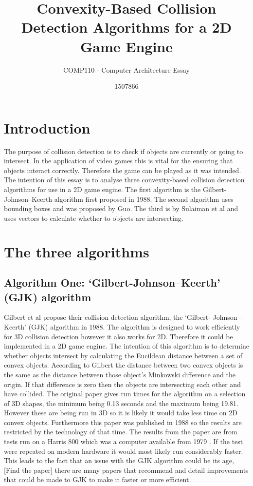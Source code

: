 \documentclass{scrartcl}
\title{Convexity-Based Collision Detection Algorithms for a 2D Game Engine}
\subtitle{COMP110 - Computer Architecture Essay}
\author{1507866}
\begin{document}
\maketitle


\section{Introduction}

The purpose of collision detection is to check if objects are currently or going to intersect. In the application of video games this is vital for the ensuring that objects interact correctly. Therefore the game can be played as it was intended.  The intention of this essay is to analyse three convexity-based collision detection algorithms for use in a 2D game engine. The first algorithm is the Gilbert- Johnson–Keerth algorithm first proposed in 1988. The second algorithm uses bounding boxes and was proposed by Guo. The third is by Sulaiman et al and uses vectors to calculate whether to objects are intersecting. 

\section{The three algorithms}
\subsection{Algorithm One: ‘Gilbert-Johnson–Keerth’ (GJK) algorithm}
Gilbert et al propose their collision detection algorithm, the ‘Gilbert- Johnson – Keerth’ (GJK) algorithm in 1988. \cite{GJK} The algorithm is designed to work efficiently for 3D collision detection however it also works for 2D. Therefore it could be implemented in a 2D game engine. The intention of this algorithm is to determine whether objects intersect by calculating the Eucildean distance between a set of convex objects. According to Gilbert the distance between two convex objects is the same as the distance between those object’s Minkowski difference and the origin. If that difference is zero then the objects are intersecting each other and have collided.
\newline 
The original paper gives run times for the algorithm on a selection of 3D shapes, the minimum being 0.13 seconds and the maximum being 19.81. However these are being run in 3D so it is likely it would take less time on 2D convex objects. Furthermore this paper was published in 1988 so the results are restricted by the technology of that time. The results from the paper are from tests run on a Harris 800 which was a computer available from 1979 \cite{harris800}. If the test were repeated on modern hardware it would most likely run considerably faster.
This leads to the fact that an issue with the GJK algorithm could be its age, [Find the paper] there are many papers that recommend and detail improvements that could be made to GJK to make it faster or more efficient. 
\end{document}
